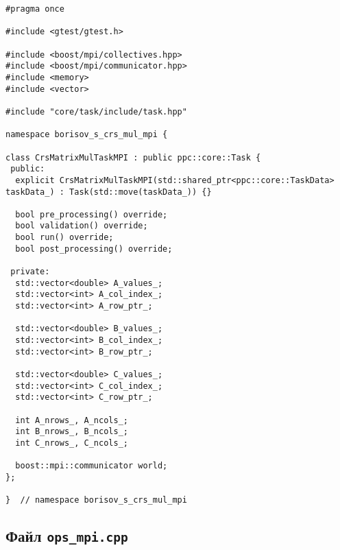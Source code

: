 \documentclass[12pt]{article}
\begin{document}
\begin{lstlisting}
#pragma once

#include <gtest/gtest.h>

#include <boost/mpi/collectives.hpp>
#include <boost/mpi/communicator.hpp>
#include <memory>
#include <vector>

#include "core/task/include/task.hpp"

namespace borisov_s_crs_mul_mpi {

class CrsMatrixMulTaskMPI : public ppc::core::Task {
 public:
  explicit CrsMatrixMulTaskMPI(std::shared_ptr<ppc::core::TaskData> taskData_) : Task(std::move(taskData_)) {}

  bool pre_processing() override;
  bool validation() override;
  bool run() override;
  bool post_processing() override;

 private:
  std::vector<double> A_values_;
  std::vector<int> A_col_index_;
  std::vector<int> A_row_ptr_;

  std::vector<double> B_values_;
  std::vector<int> B_col_index_;
  std::vector<int> B_row_ptr_;

  std::vector<double> C_values_;
  std::vector<int> C_col_index_;
  std::vector<int> C_row_ptr_;

  int A_nrows_, A_ncols_;
  int B_nrows_, B_ncols_;
  int C_nrows_, C_ncols_;

  boost::mpi::communicator world;
};

}  // namespace borisov_s_crs_mul_mpi
\end{lstlisting}

\subsection*{Файл \texttt{ops\_mpi.cpp}}
\end{document}
